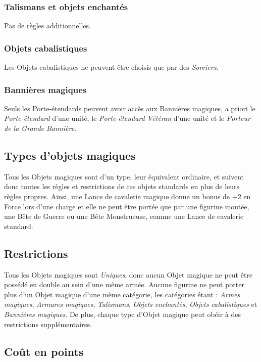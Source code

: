 \subsubsection*{Talismans et objets enchantés}

Pas de règles additionnelles.

\subsubsection*{Objets cabalistiques}

Les Objets cabalistiques ne peuvent être choisis que par des \emph{Sorciers}.

\subsubsection*{Bannières magiques}

Seuls les Porte-étendards peuvent avoir accès aux Bannières magiques, a priori le \emph{Porte-étendard} d'une unité, le \emph{Porte-étendard Vétéran} d'une unité et le \emph{Porteur de la Grande Bannière}.

\subsection{Types d'objets magiques}
Tous les Objets magiques sont d'un type, leur équivalent ordinaire, et suivent donc toutes les règles et restrictions de ces objets standards en plus de leurs règles propres. Ainsi, une Lance de cavalerie magique donne un bonus de +2 en Force lors d'une charge et elle ne peut être portée que par une figurine montée, une Bête de Guerre ou une Bête Monstrueuse, comme une Lance de cavalerie standard. 

\subsection{Restrictions}

Tous les Objets magiques sont \emph{Uniques}, donc aucun Objet magique ne peut être possédé en double au sein d'une même armée. Aucune figurine ne peut porter plus d'un Objet magique d'une même catégorie, les catégories étant : \emph{Armes magiques}, \emph{Armures magiques}, \emph{Talismans}, \emph{Objets enchantés}, \emph{Objets cabalistiques} et \emph{Bannières magiques}. De plus, chaque type d'Objet magique peut obéir à des restrictions supplémentaires.

\subsection{Coût en points}


